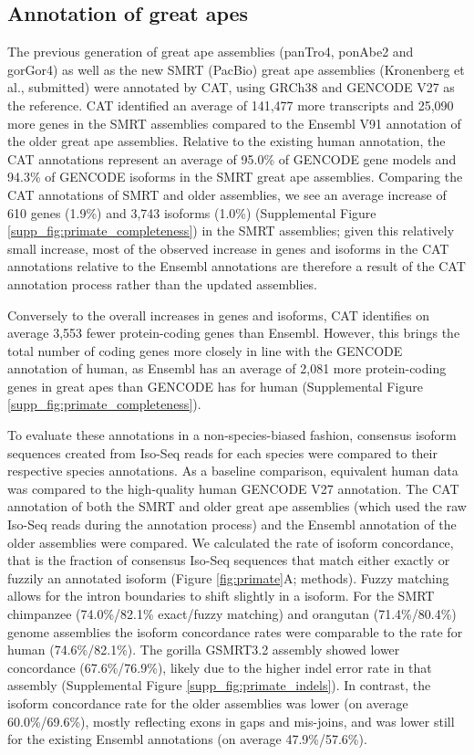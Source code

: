 \documentclass[fleqn,10pt]{wlscirep}
\begin{document}
\subsection*{Annotation of great apes}

The previous generation of great ape assemblies (panTro4, ponAbe2 and gorGor4) as well as the new SMRT (PacBio) great ape assemblies \cite{gordon2016long} (Kronenberg et al., submitted) were annotated by CAT, using GRCh38 and GENCODE V27 as the reference. CAT identified an average of 141,477 more transcripts and 25,090 more genes in the SMRT assemblies compared to the Ensembl V91 annotation of the older great ape assemblies. Relative to the existing human annotation, the CAT annotations represent an average of 95.0\% of GENCODE gene models and 94.3\% of GENCODE isoforms in the SMRT great ape assemblies. Comparing the CAT annotations of SMRT and older assemblies, we see an average increase of 610 genes (1.9\%) and 3,743 isoforms (1.0\%) (Supplemental Figure \ref{supp_fig:primate_completeness}) in the SMRT assemblies; given this relatively small increase, most of the observed increase in genes and isoforms in the CAT annotations relative to the Ensembl annotations are therefore a result of the CAT annotation process rather than the updated assemblies.

Conversely to the overall increases in genes and isoforms, CAT identifies on average 3,553 fewer protein-coding genes than Ensembl. However, this brings the total number of coding genes more closely in line with the GENCODE annotation of human, as Ensembl has an average of 2,081 more protein-coding genes in great apes than GENCODE has for human (Supplemental Figure \ref{supp_fig:primate_completeness}). 

To evaluate these annotations in a non-species-biased fashion, consensus isoform sequences created from Iso-Seq reads for each species were compared to their respective species annotations. As a baseline comparison, equivalent human data was compared to the high-quality human GENCODE V27 annotation. The CAT annotation of both the SMRT and older great ape assemblies (which used the raw Iso-Seq reads during the annotation process) and the Ensembl annotation of the older assemblies were compared. We calculated the rate of isoform concordance, that is the fraction of consensus Iso-Seq sequences that match either exactly or fuzzily an annotated isoform (Figure \ref{fig:primate}A; methods). Fuzzy matching allows for the intron boundaries to shift slightly in a isoform. For the SMRT chimpanzee (74.0\%/82.1\% exact/fuzzy matching) and orangutan (71.4\%/80.4\%) genome assemblies the isoform concordance rates were comparable to the rate for human (74.6\%/82.1\%). The gorilla GSMRT3.2 assembly showed lower concordance (67.6\%/76.9\%), likely due to the higher indel error rate in that assembly (Supplemental Figure \ref{supp_fig:primate_indels}). In contrast, the isoform concordance rate for the older assemblies was lower (on average 60.0\%/69.6\%), mostly reflecting exons in gaps and mis-joins, and was lower still for the existing Ensembl annotations (on average 47.9\%/57.6\%).
\end{document}
